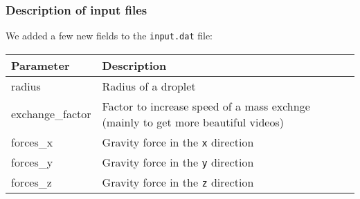 \documentclass{article}
\begin{document}
\subsubsection{Description of input
files}\label{description-of-input-files}

We added a few new fields to the \texttt{input.dat} file:

\begin{longtable}[]{@{}ll@{}}
\toprule
\begin{minipage}[b]{0.05\columnwidth}\raggedright\strut
Parameter\strut
\end{minipage} & \begin{minipage}[b]{0.05\columnwidth}\raggedright\strut
Description\strut
\end{minipage}\tabularnewline
\midrule
\endhead
\begin{minipage}[t]{0.05\columnwidth}\raggedright\strut
radius\strut
\end{minipage} & \begin{minipage}[t]{0.05\columnwidth}\raggedright\strut
Radius of a droplet\strut
\end{minipage}\tabularnewline
\begin{minipage}[t]{0.05\columnwidth}\raggedright\strut
exchange\_factor\strut
\end{minipage} & \begin{minipage}[t]{0.05\columnwidth}\raggedright\strut
Factor to increase speed of a mass exchnge (mainly to get more beautiful
videos)\strut
\end{minipage}\tabularnewline
\begin{minipage}[t]{0.05\columnwidth}\raggedright\strut
forces\_x\strut
\end{minipage} & \begin{minipage}[t]{0.05\columnwidth}\raggedright\strut
Gravity force in the \texttt{x} direction\strut
\end{minipage}\tabularnewline
\begin{minipage}[t]{0.05\columnwidth}\raggedright\strut
forces\_y\strut
\end{minipage} & \begin{minipage}[t]{0.05\columnwidth}\raggedright\strut
Gravity force in the \texttt{y} direction\strut
\end{minipage}\tabularnewline
\begin{minipage}[t]{0.05\columnwidth}\raggedright\strut
forces\_z\strut
\end{minipage} & \begin{minipage}[t]{0.05\columnwidth}\raggedright\strut
Gravity force in the \texttt{z} direction\strut
\end{minipage}\tabularnewline
\bottomrule
\end{longtable}
\end{document}
